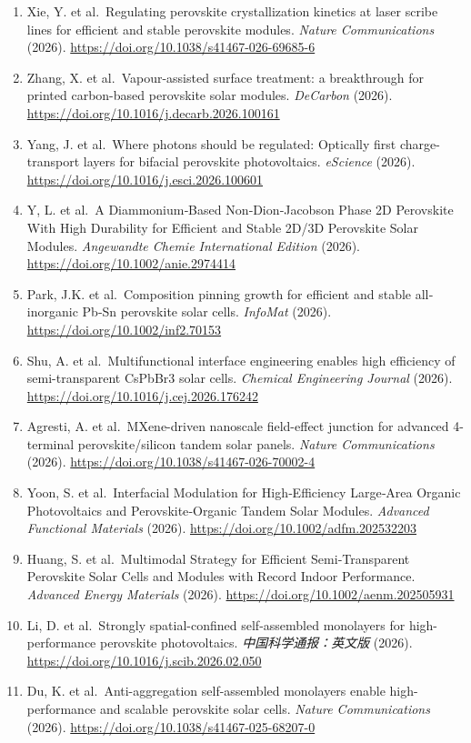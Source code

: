 \documentclass[
  11pt,
]{article}
\begin{document}
\begin{enumerate}
\item
  Xie, Y. et al.~Regulating perovskite crystallization kinetics at laser
  scribe lines for efficient and stable perovskite modules. \emph{Nature
  Communications} (2026).
  \url{https://doi.org/10.1038/s41467-026-69685-6}
\item
  Zhang, X. et al.~Vapour-assisted surface treatment: a breakthrough for
  printed carbon-based perovskite solar modules. \emph{DeCarbon} (2026).
  \url{https://doi.org/10.1016/j.decarb.2026.100161}
\item
  Yang, J. et al.~Where photons should be regulated: Optically first
  charge-transport layers for bifacial perovskite photovoltaics.
  \emph{eScience} (2026).
  \url{https://doi.org/10.1016/j.esci.2026.100601}
\item
  Y, L. et al.~A Diammonium‐Based Non‐Dion‐Jacobson Phase 2D Perovskite
  With High Durability for Efficient and Stable 2D/3D Perovskite Solar
  Modules. \emph{Angewandte Chemie International Edition} (2026).
  \url{https://doi.org/10.1002/anie.2974414}
\item
  Park, J.K. et al.~Composition pinning growth for efficient and stable
  all‐inorganic Pb‐Sn perovskite solar cells. \emph{InfoMat} (2026).
  \url{https://doi.org/10.1002/inf2.70153}
\item
  Shu, A. et al.~Multifunctional interface engineering enables high
  efficiency of semi-transparent CsPbBr3 solar cells. \emph{Chemical
  Engineering Journal} (2026).
  \url{https://doi.org/10.1016/j.cej.2026.176242}
\item
  Agresti, A. et al.~MXene-driven nanoscale field-effect junction for
  advanced 4-terminal perovskite/silicon tandem solar panels.
  \emph{Nature Communications} (2026).
  \url{https://doi.org/10.1038/s41467-026-70002-4}
\item
  Yoon, S. et al.~Interfacial Modulation for High‐Efficiency Large‐Area
  Organic Photovoltaics and Perovskite‐Organic Tandem Solar Modules.
  \emph{Advanced Functional Materials} (2026).
  \url{https://doi.org/10.1002/adfm.202532203}
\item
  Huang, S. et al.~Multimodal Strategy for Efficient Semi‐Transparent
  Perovskite Solar Cells and Modules with Record Indoor Performance.
  \emph{Advanced Energy Materials} (2026).
  \url{https://doi.org/10.1002/aenm.202505931}
\item
  Li, D. et al.~Strongly spatial-confined self-assembled monolayers for
  high-performance perovskite photovoltaics. \emph{中国科学通报：英文版}
  (2026). \url{https://doi.org/10.1016/j.scib.2026.02.050}
\item
  Du, K. et al.~Anti-aggregation self-assembled monolayers enable
  high-performance and scalable perovskite solar cells. \emph{Nature
  Communications} (2026).
  \url{https://doi.org/10.1038/s41467-025-68207-0}
\end{enumerate}
\end{document}
